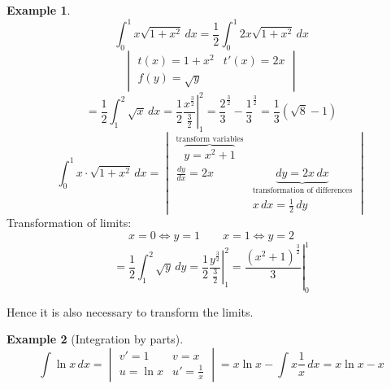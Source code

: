 \documentclass[a4paper,landscape,twocolumn]{article}
\theoremstyle{definition}
\newtheorem{ex}{Example}
\begin{document}
\begin{ex}
  \[ \int_0^1 x \sqrt{1 + x^2} \, dx = \frac12 \int_0^1 2x \sqrt{1 + x^2} \, dx \]
  \[
    \begin{vmatrix}
      t(x) = 1 + x^2    & t'(x) = 2x \\
      f(y) = \sqrt{y}   &
    \end{vmatrix}
  \] \[
    = \frac12 \int_1^2 \sqrt{x} \, dx
    = \left.\frac12 \frac{x^{\frac32}}{\frac32} \right|_1^2
    = \frac23^{\frac32} - \frac13^{\frac32}
    = \frac13 (\sqrt{8} - 1)
  \] \[
    \int_0^1 x \cdot \sqrt{1 + x^2} \, dx =
    \begin{vmatrix}
      \overbrace{y = x^2 + 1}^{\text{transform variables}}        &   \\
      \frac{dy}{dx} = 2x & \underbrace{dy = 2x \, dx}_{\text{transformation of differences}} \\
                         & x\,dx = \frac12 \, dy
    \end{vmatrix}
  \]
  Transformation of limits:
  \[ x = 0 \Leftrightarrow y = 1 \qquad x = 1 \Leftrightarrow y = 2 \]
  \[
    = \frac12 \int_1^2 \sqrt{y} \, dy
    = \left.\frac12 \frac{y^{\frac32}}{\frac32}\right|_1^2
    = \left.\frac{(x^2 + 1)^{\frac32}}{3}\right|_0^1
  \]

  Hence it is also necessary to transform the limits.
\end{ex}

\begin{ex}[Integration by parts]
  \[
    \int \ln{x} \, dx
    = \begin{vmatrix}
      v' = 1 & v = x \\
      u = \ln{x} & u' = \frac1x
    \end{vmatrix}
    = x \ln{x} - \int x \frac{1}{x} \, dx = x \ln{x} - x
  \]
\end{ex}
\end{document}
